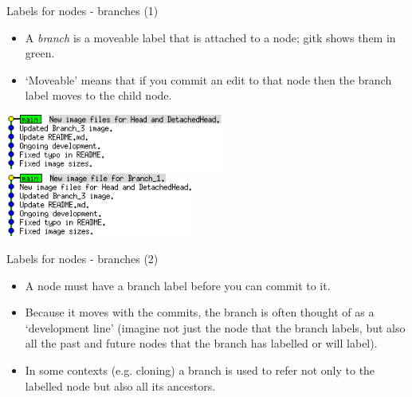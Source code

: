 \documentclass[usenames,dvipsnames]{beamer}
\begin{document}
\begin{frame}{Labels for nodes - branches (1)}
  \begin{block}{}
    \begin{itemize}
      \item{A \textit{branch} is a moveable label that is attached to a node; gitk shows them in green.}
      \item{`Moveable' means that if you commit an edit to that node then the branch label moves to the child node.}
    \end{itemize}
    \vspace{5mm}
    \begin{center}
      \includegraphics[width=0.54\textwidth]{Branch_1.png}%
      \includegraphics[width=0.46\textwidth]{Branch_2.png}
    \end{center}
  \end{block}
\end{frame}
  
\begin{frame}{Labels for nodes - branches (2)}
  \begin{block}{}
    \begin{itemize}
      \item{A node must have a branch label before you can commit to it.}
      \item{Because it moves with the commits, the branch is often thought of as a `development line' (imagine not just the node that the branch labels, but also all the past and future nodes that the branch has labelled or will label).}
      \item{In some contexts (e.g. cloning) a branch is used to refer not only to the labelled node but also all its ancestors.}
    \end{itemize}
  \end{block}
\end{frame}
\end{document}
